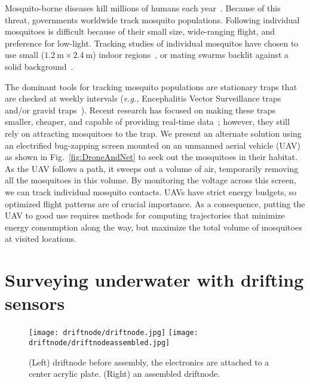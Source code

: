 Mosquito-borne diseases kill millions of humans each year~\cite{murray2012global}. 
Because of this threat, governments worldwide track mosquito populations.
Following individual mosquitoes is difficult because of their small size, wide-ranging flight, and preference for low-light.
Tracking studies of individual mosquitos have chosen to use small ($\SI{1.2}{\metre} \times \SI{2.4}{\metre}$) indoor regions~\cite{parker2015infrared}, or mating swarms backlit against a solid background~\cite{butail20113d}.

The dominant tools for tracking mosquito populations are stationary traps that are checked at weekly intervals (\textit{e.g.,} Encephalitis Vector Surveillance traps and/or gravid traps~\cite{williams2007comparison}). 
Recent research has focused on making these traps smaller, cheaper, and capable of providing real-time data~\cite{chen2014flying,linn2016building}; however, they still rely on attracting mosquitoes to the trap. 
We present an alternate solution using an electrified bug-zapping screen mounted on an unmanned aerial vehicle (UAV) as shown in Fig.~\ref{fig:DroneAndNet} to seek out the mosquitoes in their habitat.
As the UAV follows a path, it sweeps out a volume of air, temporarily removing all the mosquitoes in this volume.
By monitoring the voltage across this screen, we can track individual mosquito contacts.
UAVs have strict energy budgets, so optimized flight patterns are of crucial importance.
As a consequence, putting the UAV to good use requires methods for computing trajectories that minimize energy consumption along the way, but maximize the total volume of mosquitoes at visited locations.

\section[Drifting sensors]{Surveying underwater with drifting sensors}

\begin{figure}[h]
	\begin{center}
	\texttt{[image: driftnode/driftnode.jpg]}
	\texttt{[image: driftnode/driftnodeassembled.jpg]}
	\caption[Driftnode]{
		(Left) driftnode before assembly, the electronics are attached to a center acrylic plate.
		(Right) an assembled driftnode.
	} \label{fig:driftnodeoverview}
	\end{center}
	\vspace{-1em}
\end{figure}

